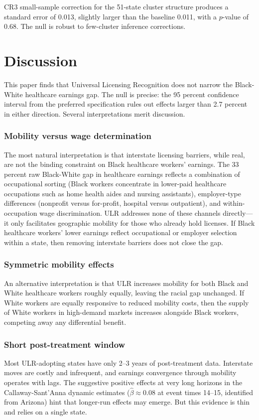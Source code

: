 \documentclass[12pt]{article}
\begin{document}
CR3 small-sample correction for the 51-state cluster structure produces a standard error of 0.013, slightly larger than the baseline 0.011, with a $p$-value of 0.68. The null is robust to few-cluster inference corrections.

\section{Discussion}

This paper finds that Universal Licensing Recognition does not narrow the Black-White healthcare earnings gap. The null is precise: the 95 percent confidence interval from the preferred specification rules out effects larger than 2.7 percent in either direction. Several interpretations merit discussion.

\subsubsection*{Mobility versus wage determination} The most natural interpretation is that interstate licensing barriers, while real, are not the binding constraint on Black healthcare workers' earnings. The 33 percent raw Black-White gap in healthcare earnings reflects a combination of occupational sorting (Black workers concentrate in lower-paid healthcare occupations such as home health aides and nursing assistants), employer-type differences (nonprofit versus for-profit, hospital versus outpatient), and within-occupation wage discrimination. ULR addresses none of these channels directly---it only facilitates geographic mobility for those who already hold licenses. If Black healthcare workers' lower earnings reflect occupational or employer selection within a state, then removing interstate barriers does not close the gap.

\subsubsection*{Symmetric mobility effects} An alternative interpretation is that ULR increases mobility for both Black and White healthcare workers roughly equally, leaving the racial gap unchanged. If White workers are equally responsive to reduced mobility costs, then the supply of White workers in high-demand markets increases alongside Black workers, competing away any differential benefit.

\subsubsection*{Short post-treatment window} Most ULR-adopting states have only 2--3 years of post-treatment data. Interstate moves are costly and infrequent, and earnings convergence through mobility operates with lags. The suggestive positive effects at very long horizons in the Callaway-Sant'Anna dynamic estimates ($\hat{\beta} \approx 0.08$ at event times 14--15, identified from Arizona) hint that longer-run effects may emerge. But this evidence is thin and relies on a single state.
\end{document}
